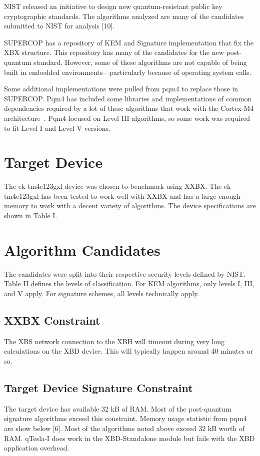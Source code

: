 \documentclass[10pt]{article}
\begin{document}
NIST released an initiative to design new quantum-resistant public key cryptographic 
standards. The algorithms analyzed are many of the candidates submitted to NIST for 
analysis [10].

SUPERCOP has a repository of KEM and Signature implementation that fix the XBX structure. 
This repository has many of the candidates for the new post-quantum standard. 
However, some of these algorithms are not capable of being built in embedded 
environments—particularly because of operating system calls.

Some additional implementations were pulled from pqm4 to replace those in SUPERCOP. 
Pqm4 has included some libraries and implementations of common dependencies required by 
a lot of these algorithms that work with the Cortex-M4 architecture~\cite{PQM4}. Pqm4 focused on 
Level III algorithms, so some work was required to fit Level I and Level V versions. 

\section{Target Device}

The ek-tm4c123gxl device was chosen to benchmark using XXBX. 
The ek-tm4c123gxl has been tested to work well with XXBX and has a large enough memory 
to work with a decent variety of algorithms. The device specifications are shown in Table I.

\section{Algorithm Candidates}

The candidates were split into their respective security levels defined by NIST. 
Table II defines the levels of classification.
For KEM algorithms, only levels I, III, and V apply. For signature schemes, all levels 
technically apply.

\subsection{XXBX Constraint}
The XBS network connection to the XBH will timeout during very long calculations on 
the XBD device. This will typically happen around 40 minutes or so.

\subsection{Target Device Signature Constraint}
The target device has available 32 kB of RAM. Most of the post-quantum signature 
algorithms exceed this constraint. Memory usage statistic from pqm4 are show below [6].
Most of the algorithms noted above exceed 32 kB worth of RAM. qTesla-I does work in the 
XBD-Standalone module but fails with the XBD application overhead.
\end{document}
